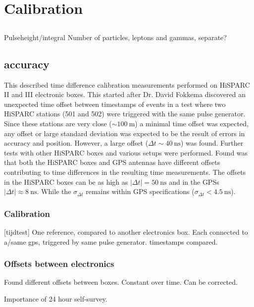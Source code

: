\chapter{Calibration}
\label{ch:calibration}

\section{\pmt}

Pulseheight/integral
Number of particles, leptons and gammas, separate?


\section{\gps accuracy}

This described time difference calibration measurements performed on
HiSPARC II and III electronic boxes. This started after Dr. David
Fokkema discovered an unexpected time offset between timestamps of
events in a test where two HiSPARC stations (501 and 502) were triggered
with the same pulse generator. Since these stations are very close
($\sim\SI{100}{\meter}$) a minimal time offset was expected, any offset
or large standard deviation was expected to be the result of errors in
\gps accuracy and position. However, a large offset ($\Delta t
\sim\SI{40}{\nano\second}$) was found. Further tests with other HiSPARC
boxes and various setups were performed. Found was that both the HiSPARC
boxes and GPS antennas have different offsets contributing to time
differences in the resulting time measurements. The offsets in the
HiSPARC boxes can be as high as $|\Delta t| = \SI{50}{\nano\second}$ and
in the GPSs $|\Delta t| \approx \SI{8}{\nano\second}$. While the
$\sigma_{\Delta t}$ remains within GPS specifications ($\sigma_{\Delta
t} < \SI{4.5}{\nano\second}$).


\subsection{Calibration}

[tijdtest]
One reference, compared to another \hisparc electronics box.
Each connected to a/same gps, triggered by same pulse generator.
\gps timestamps compared.

\subsection{Offsets between \hisparc electronics}

Found different offsets between boxes.
Constant over time.
Can be corrected.

Importance of 24 hour self-survey.
